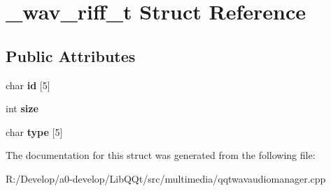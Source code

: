 \hypertarget{struct__wav__riff__t}{}\section{\+\_\+wav\+\_\+riff\+\_\+t Struct Reference}
\label{struct__wav__riff__t}
\subsection*{Public Attributes}
\begin{DoxyCompactItemize}
\item 
\mbox{\label{struct__wav__riff__t_aabd9115f416e797e22948de254555ec0}} 
char {\bfseries id} \mbox{[}5\mbox{]}
\item 
\mbox{\label{struct__wav__riff__t_a5144abcfd7d87a67b25f489317180083}} 
int {\bfseries size}
\item 
\mbox{\label{struct__wav__riff__t_afb9842972ff13265a050188fda07c112}} 
char {\bfseries type} \mbox{[}5\mbox{]}
\end{DoxyCompactItemize}


The documentation for this struct was generated from the following file\+:\begin{DoxyCompactItemize}
\item 
R\+:/\+Develop/a0-\/develop/\+Lib\+Q\+Qt/src/multimedia/qqtwavaudiomanager.\+cpp\end{DoxyCompactItemize}
